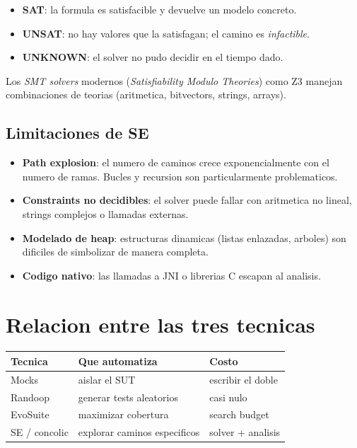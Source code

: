 \documentclass[12pt,a4paper]{article}
\begin{document}
\begin{itemize}
  \item \textbf{SAT}: la formula es satisfacible y devuelve un modelo concreto.
  \item \textbf{UNSAT}: no hay valores que la satisfagan; el camino es \emph{infactible}.
  \item \textbf{UNKNOWN}: el solver no pudo decidir en el tiempo dado.
\end{itemize}

Los \emph{SMT solvers} modernos (\emph{Satisfiability Modulo Theories}) como Z3 manejan
combinaciones de teorias (aritmetica, bitvectors, strings, arrays).

\subsection{Limitaciones de SE}

\begin{itemize}
  \item \textbf{Path explosion}: el numero de caminos crece exponencialmente con el numero de
  ramas. Bucles y recursion son particularmente problematicos.
  \item \textbf{Constraints no decidibles}: el solver puede fallar con aritmetica no lineal,
  strings complejos o llamadas externas.
  \item \textbf{Modelado de heap}: estructuras dinamicas (listas enlazadas, arboles) son
  dificiles de simbolizar de manera completa.
  \item \textbf{Codigo nativo}: las llamadas a JNI o librerias C escapan al analisis.
\end{itemize}

\section{Relacion entre las tres tecnicas}

\begin{center}
\begin{tabular}{lll}
\toprule
Tecnica & Que automatiza & Costo \\
\midrule
Mocks & aislar el SUT & escribir el doble \\
Randoop & generar tests aleatorios & casi nulo \\
EvoSuite & maximizar cobertura & search budget \\
SE / concolic & explorar caminos especificos & solver + analisis \\
\bottomrule
\end{tabular}
\end{center}
\end{document}
